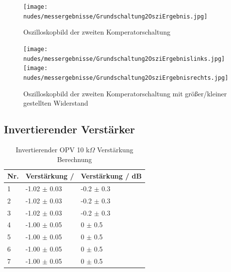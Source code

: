 \documentclass[12pt,a4paper,twoside]{article}
\begin{document}
\begin{figure}[H]
    \centering
    \texttt{[image: nudes/messergebnisse/Grundschaltung2OsziErgebnis.jpg]}
    \caption{Oszilloskopbild der zweiten Komperatorschaltung}
    \label{fig:Grundschaltung2ErgebnissAW}
\end{figure}

\begin{figure}[H]
    \centering
    \texttt{[image: nudes/messergebnisse/Grundschaltung2OsziErgebnislinks.jpg]}
    \texttt{[image: nudes/messergebnisse/Grundschaltung2OsziErgebnisrechts.jpg]}
    \caption{Oszilloskopbild der zweiten Komperatorschaltung mit größer/kleiner gestellten Widerstand}
    \label{fig:Grundschaltung2ErgebnissPotiAW}
\end{figure}


\subsection{Invertierender Verstärker}

\begin{table}[H]
    \centering
    \caption{Invertierender OPV 10 k$\Omega$ Verstärkung Berechnung}
    \label{tab:IoVerstärkungenBerechnet10AW}
    \begin{tabular}{| l | l | l |}
        \hline
        Nr. & Verstärkung / & Verstärkung / dB \\
        \hline
        1 & -1.02 $\pm$ 0.03 & -0.2 $\pm$ 0.3 \\
        2 & -1.02 $\pm$ 0.03 & -0.2 $\pm$ 0.3 \\
        3 & -1.02 $\pm$ 0.03 & -0.2 $\pm$ 0.3 \\
        4 & -1.00 $\pm$ 0.05 &  0 $\pm$ 0.5 \\
        5 & -1.00 $\pm$ 0.05 &  0 $\pm$ 0.5 \\
        6 & -1.00 $\pm$ 0.05 &  0 $\pm$ 0.5 \\
        7 & -1.00 $\pm$ 0.05 &  0 $\pm$ 0.5 \\
        \hline
    \end{tabular}
\end{table}
\end{document}
